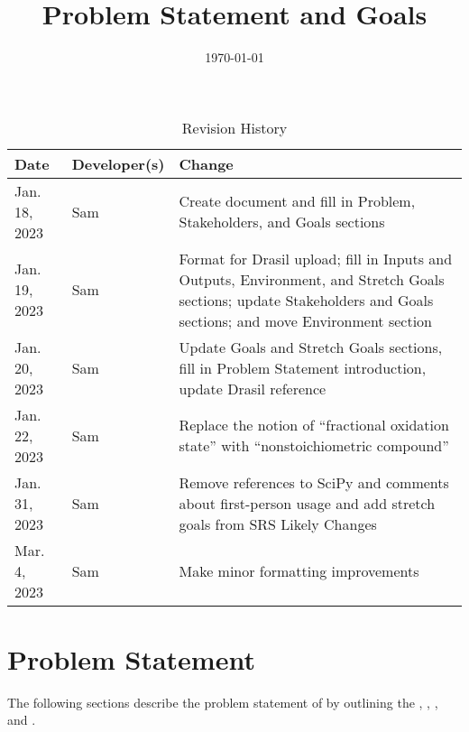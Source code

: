 \documentclass{article}
\title{Problem Statement and Goals\\\progname}
\author{\authname}
\date{\today}
\begin{document}
\maketitle

\begin{table}[hp]
	\caption{Revision History} \label{TblRevisionHistory}
	\begin{tabularx}{\textwidth}{llX}
		\toprule
		\textbf{Date} & \textbf{Developer(s)} & \textbf{Change}              \\
		\midrule
		Jan. 18, 2023 & Sam                   & Create document and fill in
		Problem, Stakeholders, and Goals sections                            \\
		Jan. 19, 2023 & Sam                   & Format for Drasil upload;
		fill in Inputs and Outputs, Environment, and Stretch Goals sections;
		update Stakeholders and Goals sections; and move Environment section \\
		Jan. 20, 2023 & Sam                   & Update Goals and Stretch
		Goals sections, fill in Problem Statement introduction, update
		Drasil reference                                                     \\
		Jan. 22, 2023 & Sam                   & Replace the notion of
		``fractional oxidation state'' with ``nonstoichiometric compound''   \\
		Jan. 31, 2023 & Sam                   & Remove references to SciPy
		and comments about first-person usage and add stretch goals from SRS
		Likely Changes                                                       \\
		Mar. 4, 2023  & Sam                   & Make minor formatting
		improvements                                                         \\
		\bottomrule
	\end{tabularx}
\end{table}

\section{Problem Statement}

\null\newline
\null\newline
\noindent The following sections describe the problem statement of \progname{}
by outlining the , , , and
.
\end{document}
